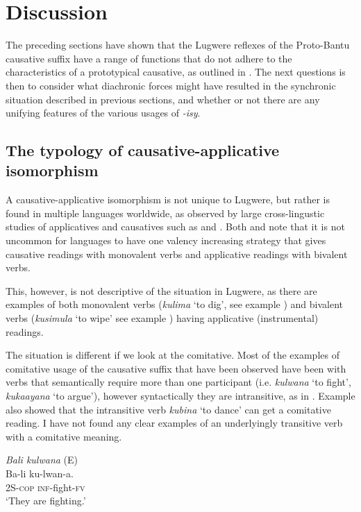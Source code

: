 \documentclass[output=paper,colorlinks,citecolor=brown,draftmode]{langscibook}
\begin{document}
\section{Discussion} \label{sec:Saebo:discussion}

The preceding sections have shown that the Lugwere reflexes of the Proto-Bantu causative suffix have a range of functions that do not adhere to the characteristics of a prototypical causative, as outlined in . The next questions is then to consider what diachronic forces might have resulted in the synchronic situation described in previous sections, and whether or not there are any unifying features of the various usages of \emph{-isy}.

\subsection{The typology of causative-applicative isomorphism } \label{sec:Saebo:typology}

A causative-applicative isomorphism is not unique to Lugwere, but rather is found in multiple languages worldwide, as observed by large cross-lingustic studies of applicatives and causatives such as \citet{peterson2006applicative} and \citet{dixon2010basic}. Both \citet{peterson2006applicative} and \citet{dixon2010basic} note that it is not uncommon for languages to have one valency increasing strategy that gives causative readings with monovalent verbs and applicative readings with bivalent verbs. 

This, however, is not descriptive of the situation in Lugwere, as there are examples of both monovalent verbs (\emph{kulima} `to dig', see example ) and bivalent verbs (\emph{kusimula} `to wipe' see example ) having applicative (instrumental) readings. 

The situation is different if we look at the comitative. Most of the examples of comitative usage of the causative suffix that have been observed have been with verbs that semantically require more than one participant (i.e. \emph{kulwana} `to fight', \emph{kukaayana} `to argue'), however syntactically they are intransitive, as in . Example  also showed that the intransitive verb \emph{kubina} `to dance' can get a comitative reading. I have not found any clear examples of an underlyingly transitive verb with a comitative meaning. 

\ea \label{ex:Saebo:transitivity} \emph{Bali kulwana} (E) \\
  \gll  Ba-li ku-lwan-a. \\ 
2S-\textsc{cop} \textsc{inf}-fight-\textsc{fv} \\
    \glt  `They are fighting.' 
      \z
\end{document}
